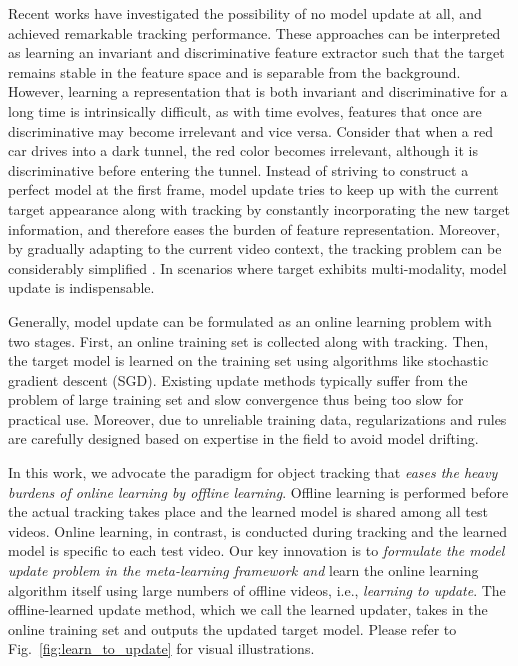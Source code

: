 \documentclass[journal]{IEEEtran}
\begin{document}
Recent works \cite{tao2016siamese, bertinetto2016fully} have investigated the possibility of no model update at all, and achieved remarkable tracking performance. These approaches can be interpreted as learning an invariant and discriminative feature extractor such that the target remains stable in the feature space and is separable from the background. However, learning a representation that is both invariant and discriminative for a long time is intrinsically difficult, as with time evolves, features that once are discriminative may become irrelevant and vice versa. Consider that when a red car drives into a dark tunnel, the red color becomes irrelevant, although it is discriminative before entering the tunnel. Instead of striving to construct a perfect model at the first frame, model update tries to keep up with the current target appearance along with tracking by constantly incorporating the new target information, and therefore eases the burden of feature representation. Moreover, by gradually adapting to the current video context, the tracking problem can be considerably simplified \cite{grabner2008semi}. In scenarios where target exhibits multi-modality, model update is indispensable.

Generally, model update can be formulated as an online learning problem with two stages. First, an online training set is collected along with tracking. Then, the target model is learned on the training set using algorithms like stochastic gradient descent (SGD). Existing update methods typically suffer from the problem of large training set and slow convergence thus being too slow for practical use. Moreover, due to unreliable training data, regularizations and rules are carefully designed based on expertise in the field to avoid model drifting.

In this work, we advocate the paradigm for object tracking that \emph{eases the heavy burdens of online learning by offline learning}. Offline learning is performed before the actual tracking takes place and the learned model is shared among all test videos. Online learning, in contrast, is conducted during tracking and the learned model is specific to each test video. Our key innovation is to \emph{formulate the model update problem in the meta-learning framework and} learn the online learning algorithm itself using large numbers of offline videos, i.e., \emph{learning to update}. The offline-learned update method, which we call the learned updater, takes in the online training set and outputs the updated target model. Please refer to Fig.~\ref{fig:learn_to_update} for visual illustrations.
\end{document}
